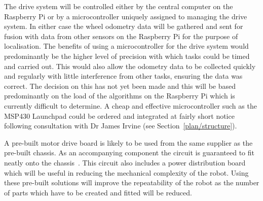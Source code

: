 The drive system will be controlled either by the central computer on
the Raspberry Pi or by a microcontroller uniquely assigned to managing the
drive system. In either case the wheel odometry data will be gathered and
sent for fusion with data from other sensors on the Raspberry Pi for the
purpose of localisation. The benefits of using a microcontroller for the
drive system would predominantly be the higher level of precision with
which tasks could be timed and carried out. This would also allow the
odometry data to be collected quickly and regularly with little
interference from other tasks, ensuring the data was correct. The decision
on this has not yet been made and this will be based predominantly on the
load of the algorithms on the Raspberry Pi which is currently difficult to
determine. A cheap and effective microcontroller such as the MSP430
Launchpad could be ordered and integrated at fairly short notice following consultation with Dr James Irvine (see Section~\ref{plan/structure}).

A pre-built motor drive board is likely to be used from the same supplier as the
pre-built chassis. As an
accompanying component the circuit is guaranteed to fit neatly onto the
chassis~\cite{pololudriver}. This circuit also includes a power distribution board
which will be useful in reducing the mechanical complexity of the robot.
Using these pre-built solutions will improve the repeatability of the
robot as the number of parts which have to be created and fitted will be
reduced.  
